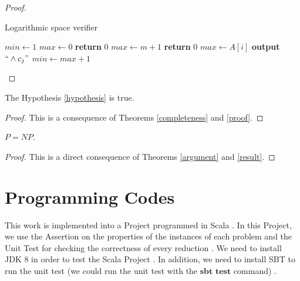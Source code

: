 \documentclass[a4paper,UKenglish,cleveref, autoref]{lipics-v2019}
\begin{document}
\begin{proof}
\begin{algorithm}
\caption{Logarithmic space verifier}\label{algorithm}
\begin{algorithmic}[1]
\State $min \gets 1$
\State $max \gets 0$
\State \textbf{return} $0$
\EndIf
{}
\State $max \gets m + 1$
\State \textbf{return} $0$
\Else
\State $max \gets A[i]$
\EndIf
{}
\State \textbf{output} $``\wedge c_{j}"$
\EndFor
\State $min \gets max + 1$
\EndFor
\EndProcedure
\end{algorithmic}
\end{algorithm}
\end{proof}

\begin{theorem}
\label{result}
The Hypothesis \ref{hypothesis} is true.
\end{theorem}

\begin{proof}
This is a consequence of Theorems \ref{completeness} and \ref{proof}.
\end{proof}

\begin{theorem}
$P = NP$.
\end{theorem}

\begin{proof}
This is a direct consequence of Theorems \ref{argument} and \ref{result}.
\end{proof}

\section{Programming Codes}

This work is implemented into a Project programmed in Scala \cite{FV19}. In this Project, we use the Assertion on the properties of the instances of each problem and the Unit Test for checking the correctness of every reduction \cite{FV19}. We need to install JDK 8 in order to test the Scala Project \cite{OD16}. In addition, we need to install SBT to run the unit test (we could run the unit test with the $\textbf{sbt test}$ command) \cite{OD16}.
\end{document}
